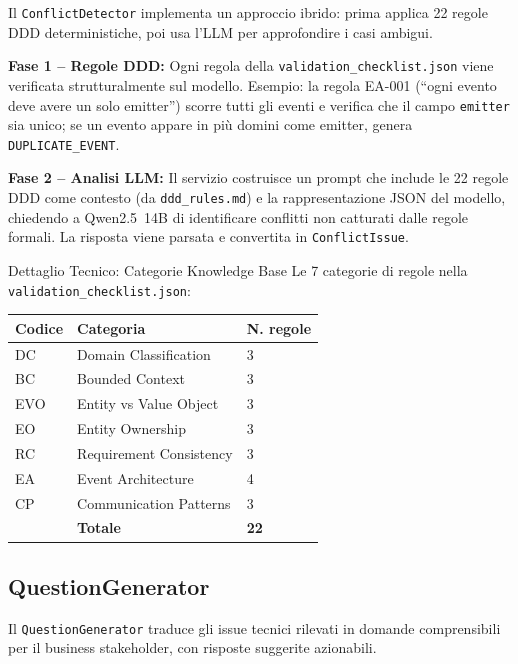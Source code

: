 \documentclass[12pt,a4paper]{report}
\begin{document}
Il \texttt{ConflictDetector} implementa un approccio ibrido: prima applica
22 regole DDD deterministiche, poi usa l'LLM per approfondire i casi ambigui.

\textbf{Fase 1 -- Regole DDD:} Ogni regola della \texttt{validation\_checklist.json}
viene verificata strutturalmente sul modello. Esempio: la regola EA-001
(``ogni evento deve avere un solo emitter'') scorre tutti gli eventi e verifica
che il campo \texttt{emitter} sia unico; se un evento appare in più domini
come emitter, genera \texttt{DUPLICATE\_EVENT}.

\textbf{Fase 2 -- Analisi LLM:} Il servizio costruisce un prompt che include
le 22 regole DDD come contesto (da \texttt{ddd\_rules.md}) e la rappresentazione
JSON del modello, chiedendo a Qwen2.5~14B di identificare conflitti non
catturati dalle regole formali. La risposta viene parsata e convertita in
\texttt{ConflictIssue}.

\begin{technicalbox}{Dettaglio Tecnico: Categorie Knowledge Base}
Le 7 categorie di regole nella \texttt{validation\_checklist.json}:
\begin{center}
\begin{tabular}{lll}
\toprule
Codice & Categoria & N. regole \\
\midrule
DC  & Domain Classification        & 3 \\
BC  & Bounded Context              & 3 \\
EVO & Entity vs Value Object       & 3 \\
EO  & Entity Ownership             & 3 \\
RC  & Requirement Consistency      & 3 \\
EA  & Event Architecture           & 4 \\
CP  & Communication Patterns       & 3 \\
\midrule
    & \textbf{Totale}              & \textbf{22} \\
\bottomrule
\end{tabular}
\end{center}
\end{technicalbox}

\subsection{QuestionGenerator}

Il \texttt{QuestionGenerator} traduce gli issue tecnici rilevati in domande
comprensibili per il business stakeholder, con risposte suggerite azionabili.
\end{document}
